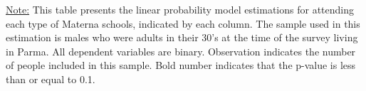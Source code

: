 \begin{footnotesize}
\noindent\underline{Note:} This table presents the linear probability model estimations for attending each type of Materna schools, indicated by each column. The sample used in this estimation is males who were adults in their 30's at the time of the survey living in Parma. All dependent variables are binary. Observation indicates the number of people included in this sample. Bold number indicates that the p-value is less than or equal to 0.1.
\end{footnotesize}
